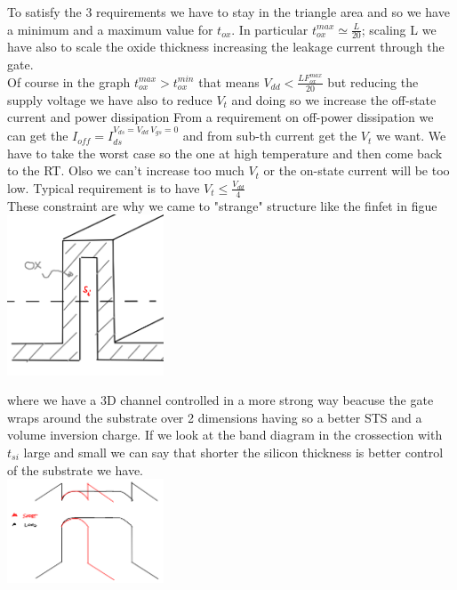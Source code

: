 To satisfy the 3 requirements we have to stay in the triangle area and so we have a minimum and a maximum value for $t_{ox}$. In particular $t_{ox}^{max}\simeq \frac{L}{20}$; scaling L we have also to scale the oxide thickness increasing the leakage current through the gate.\\

\vspace{5mm}
Of course in the graph $t_{ox}^{max}>t_{ox}^{min}$ that means $V_{dd}<\frac{LF_{ox}^{max}}{20}$ but reducing the supply voltage we have also to reduce $V_t$ and doing so we increase the off-state current and power dissipation
From a requirement on off-power dissipation we can get the $I_{off}=I_{ds}^{V_{ds}=V_{dd} \ V_{gs}=0}$ and from sub-th current get the $V_t$ we want. We have to take the worst case so the one at high temperature and then come back to the RT. Olso we can't increase too much $V_t$ or the on-state current will be too low. Typical requirement is to have $V_t \le \frac{V_{dd}}{4}$\\

These constraint are why we came to "strange" structure like the finfet in figue \\

\centering
\includegraphics[width=0.35\textwidth]{finfet.png}\\
\raggedright

where we have a 3D channel controlled in a more strong way beacuse the gate wraps around the substrate over 2 dimensions having so a better STS and a volume inversion charge.
If we look at the band diagram in the crossection with $t_{si}$ large and small we can say that shorter the silicon thickness is better control of the substrate we have.\\

\centering
\includegraphics[width=0.35\textwidth]{finfetbd.png}\\
\raggedright

